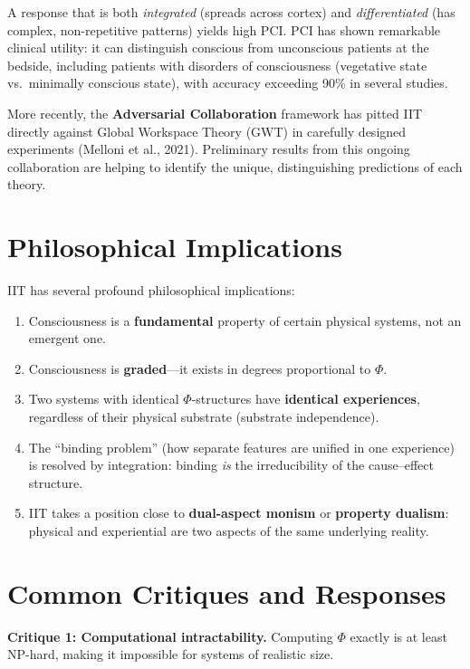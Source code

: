 \documentclass[11pt,a4paper]{report}
\newcommand{\Phi}{\varPhi}
\begin{document}
A response that is both \emph{integrated} (spreads across cortex) and \emph{differentiated} (has complex, non-repetitive patterns) yields high PCI. PCI has shown remarkable clinical utility: it can distinguish conscious from unconscious patients at the bedside, including patients with disorders of consciousness (vegetative state vs.\ minimally conscious state), with accuracy exceeding 90\% in several studies.

More recently, the \textbf{Adversarial Collaboration} framework has pitted IIT directly against Global Workspace Theory (GWT) in carefully designed experiments (Melloni et al., 2021). Preliminary results from this ongoing collaboration are helping to identify the unique, distinguishing predictions of each theory.

\section{Philosophical Implications}

IIT has several profound philosophical implications:

\begin{enumerate}[label=(\alph*), leftmargin=2em]
  \item Consciousness is a \textbf{fundamental} property of certain physical systems, not an emergent one.
  \item Consciousness is \textbf{graded}---it exists in degrees proportional to $\Phi$.
  \item Two systems with identical $\Phi$-structures have \textbf{identical experiences}, regardless of their physical substrate (substrate independence).
  \item The ``binding problem'' (how separate features are unified in one experience) is resolved by integration: binding \emph{is} the irreducibility of the cause--effect structure.
  \item IIT takes a position close to \textbf{dual-aspect monism} or \textbf{property dualism}: physical and experiential are two aspects of the same underlying reality.
\end{enumerate}

\section{Common Critiques and Responses}

\textbf{Critique 1: Computational intractability.} Computing $\Phi$ exactly is at least NP-hard, making it impossible for systems of realistic size.
\end{document}
